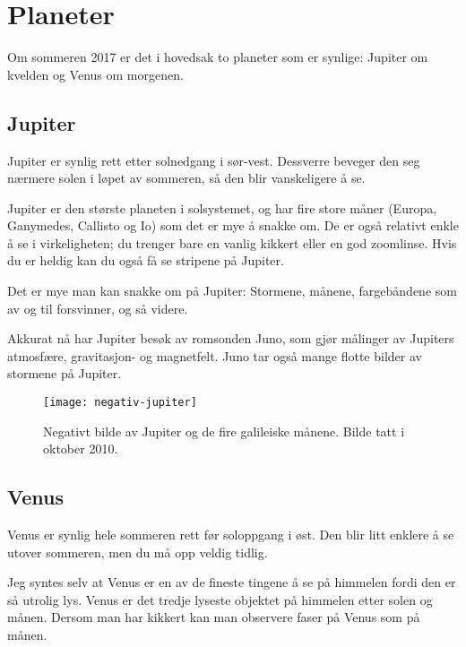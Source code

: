 \documentclass[../SommerstjernerA4.tex]{subfiles}
\begin{document}
\section{Planeter}
Om sommeren 2017 er det i hovedsak to planeter som er synlige: Jupiter om kvelden og Venus om morgenen.
\subsection{Jupiter}
Jupiter er synlig rett etter solnedgang i sør-vest. Dessverre beveger den seg nærmere solen i løpet av sommeren, så den blir vanskeligere å se.

Jupiter er den største planeten i solsystemet, og har fire store måner (Europa, Ganymedes, Callisto og Io) som det er mye å snakke om. De er også relativt enkle å se i virkeligheten; du trenger bare en vanlig kikkert eller en god zoomlinse. Hvis du er heldig kan du også få se stripene på Jupiter.

Det er mye man kan snakke om på Jupiter: Stormene, månene, fargebåndene som av og til forsvinner, og så videre.

Akkurat nå har Jupiter besøk av romsonden Juno, som gjør målinger av Jupiters atmosfære, gravitasjon- og magnetfelt. Juno tar også mange flotte bilder av stormene på Jupiter.

\begin{figure}[bh]
\centering
\texttt{[image: negativ-jupiter]}
\caption{Negativt bilde av Jupiter og de fire galileiske månene. Bilde tatt i oktober 2010.}
\end{figure}

\subsection{Venus}
Venus er synlig hele sommeren rett før soloppgang i øst. Den blir litt enklere å se utover sommeren, men du må opp veldig tidlig.

Jeg syntes selv at Venus er en av de fineste tingene å se på himmelen fordi den er så utrolig lys. Venus er det tredje lyseste objektet på himmelen etter solen og månen. Dersom man har kikkert kan man observere faser på Venus som på månen. 
\end{document}
